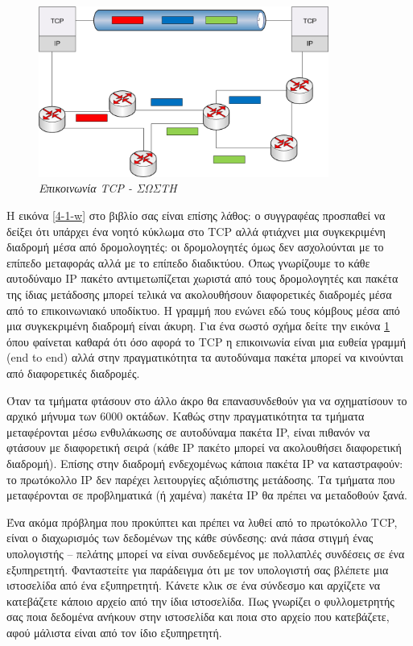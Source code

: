 \begin{figure}[!ht]
 \centering
 \includegraphics[width=0.85\textwidth]{images/chapter4/4-1-r}
 \caption {\textsl{Επικοινωνία TCP - ΣΩΣΤΗ}}
 \label{4-1-r}
\end{figure}

Η εικόνα \ref{4-1-w} στο βιβλίο σας είναι επίσης λάθος: ο συγγραφέας προσπαθεί να δείξει ότι υπάρχει ένα νοητό κύκλωμα στο TCP αλλά φτιάχνει μια συγκεκριμένη διαδρομή μέσα από δρομολογητές: οι δρομολογητές όμως δεν ασχολούνται με το επίπεδο μεταφοράς αλλά με το επίπεδο διαδικτύου. Όπως γνωρίζουμε το κάθε αυτοδύναμο IP πακέτο αντιμετωπίζεται χωριστά από τους δρομολογητές και πακέτα της ίδιας μετάδοσης μπορεί τελικά να ακολουθήσουν διαφορετικές διαδρομές μέσα από το επικοινωνιακό υποδίκτυο. Η γραμμή που ενώνει εδώ τους κόμβους μέσα από μια συγκεκριμένη διαδρομή είναι άκυρη. Για ένα σωστό σχήμα δείτε την εικόνα \ref{4-1-r} όπου φαίνεται καθαρά ότι όσο αφορά το TCP η επικοινωνία είναι μια ευθεία γραμμή (end to end) αλλά στην πραγματικότητα τα αυτοδύναμα πακέτα μπορεί να κινούνται από διαφορετικές διαδρομές.

Όταν τα τμήματα φτάσουν στο άλλο άκρο θα επανασυνδεθούν για να σχηματίσουν το αρχικό μήνυμα των 6000 οκτάδων. Καθώς στην πραγματικότητα τα τμήματα μεταφέρονται μέσω ενθυλάκωσης σε αυτοδύναμα πακέτα IP, είναι πιθανόν να φτάσουν με διαφορετική σειρά (κάθε IP πακέτο μπορεί να ακολουθήσει διαφορετική διαδρομή). Επίσης στην διαδρομή ενδεχομένως κάποια πακέτα IP να καταστραφούν: το πρωτόκολλο IP δεν παρέχει λειτουργίες αξιόπιστης μετάδοσης. Τα τμήματα που μεταφέρονται σε προβληματικά (ή χαμένα) πακέτα IP θα πρέπει να μεταδοθούν ξανά.

Ένα ακόμα πρόβλημα που προκύπτει και πρέπει να λυθεί από το πρωτόκολλο TCP, είναι ο διαχωρισμός των δεδομένων της κάθε σύνδεσης: ανά πάσα στιγμή ένας υπολογιστής -- πελάτης μπορεί να είναι συνδεδεμένος με πολλαπλές συνδέσεις σε ένα εξυπηρετητή. Φανταστείτε για παράδειγμα ότι με τον υπολογιστή σας βλέπετε μια ιστοσελίδα από ένα εξυπηρετητή. Κάνετε κλικ σε ένα σύνδεσμο και αρχίζετε να κατεβάζετε κάποιο αρχείο από την ίδια ιστοσελίδα. Πως γνωρίζει ο φυλλομετρητής σας ποια δεδομένα ανήκουν στην ιστοσελίδα και ποια στο αρχείο που κατεβάζετε, αφού μάλιστα είναι από τον ίδιο εξυπηρετητή.

